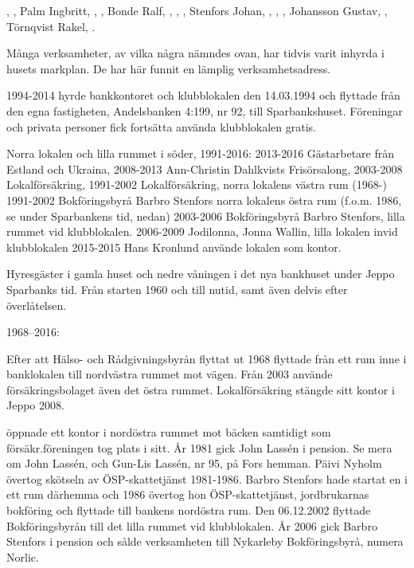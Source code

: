 , , Palm Ingbritt, , , Bonde Ralf, , , , Stenfors Johan, , , , Johansson Gustav, , Törnqvist Rakel, .



Många verksamheter, av vilka några nämndes ovan, har tidvis varit inhyrda i husets markplan. De har här funnit en lämplig verksamhetsadress.

1994-2014
 hyrde bankkontoret och klubblokalen den 14.03.1994 och flyttade från den egna fastigheten, Andelsbanken 4:199, nr 92, till Sparbankshuset. Föreningar och privata personer fick fortsätta använda klubblokalen gratis.

Norra lokalen och lilla rummet i söder, 1991-2016:
2013-2016   Gästarbetare från Estland och Ukraina,
2008-2013   Ann-Christin Dahlkvists Frisörsalong,
2003-2008   Lokalförsäkring,
1991-2002   Lokalförsäkring, norra lokalens västra rum (1968-)
1991-2002   Bokföringsbyrå Barbro Stenfors norra lokalens	östra rum (f.o.m. 1986, se under Sparbankens tid, nedan)
2003-2006   Bokföringsbyrå Barbro Stenfors, lilla rummet vid klubblokalen.
2006-2009   Jodilonna, Jonna Wallin, lilla lokalen invid klubblokalen
2015-2015   Hans Kronlund använde lokalen som kontor.

Hyresgäster i gamla huset och nedre våningen i det nya bankhuset under Jeppo Sparbanks tid. Från starten 1960 och till nutid, samt även delvis efter överlåtelsen.


1968--2016:

Efter att Hälso- och Rådgivningsbyrån flyttat ut 1968 flyttade  från ett rum inne i banklokalen till nordvästra rummet mot vägen. Från 2003 använde försäkringsbolaget även det östra rummet.	Lokalförsäkring stängde sitt kontor i Jeppo 2008.

 öppnade ett kontor i nordöstra rummet mot bäcken samtidigt som försäkr.föreningen tog plats i sitt. År 1981 gick John Lassén i pension. Se mera om John Lassén, och Gun-Lis Lassén, nr 95, på Fors hemman. Päivi Nyholm övertog skötseln av ÖSP-skattetjänst 1981-1986. Barbro Stenfors hade startat en  i ett rum därhemma och 1986 övertog hon ÖSP-skattetjänst, jordbrukarnas bokföring och flyttade till bankens nordöstra rum. Den 06.12.2002 flyttade Bokföringsbyrån till det lilla rummet vid klubblokalen. År 2006 gick Barbro Stenfors i pension och sålde verksamheten till Nykarleby Bokföringsbyrå, numera Norlic.

